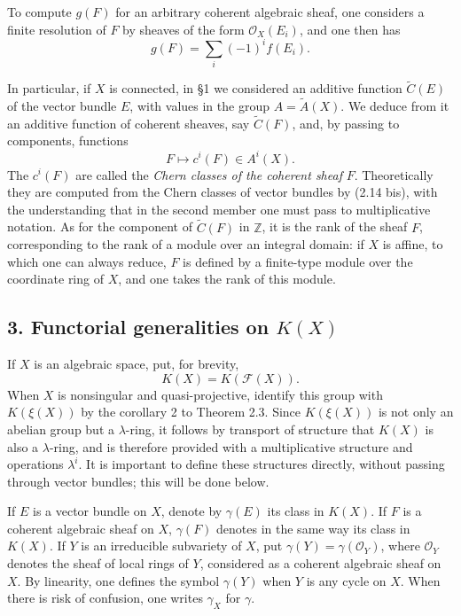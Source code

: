 \documentclass[11pt]{article}
\providecommand{\Z}{\mathbb Z}
\providecommand{\Atil}{\widetilde A}
\providecommand{\Ctil}{\widetilde C}
\providecommand{\cF}{\mathscr F}
\providecommand{\cO}{\mathcal O}
\begin{document}
To compute $g(F)$ for an arbitrary coherent algebraic sheaf, one considers a finite resolution of $F$ by sheaves of the form $\cO_X(E_i)$, and one then has
\begin{equation}\tag{2.14 bis}
 g(F)=\sum_i (-1)^i f(E_i).
\end{equation}

In particular, if $X$ is connected, in \S 1 we considered an additive function $\Ctil(E)$ of the vector bundle $E$, with values in the group $A=\Atil(X)$. We deduce from it an additive function of coherent sheaves, say $\Ctil(F)$, and, by passing to components, functions
\[
 F\longmapsto c^i(F)\in A^i(X).
\]
The $c^i(F)$ are called the \emph{Chern classes of the coherent sheaf} $F$. Theoretically they are computed from the Chern classes of vector bundles by (2.14 bis), with the understanding that in the second member one must pass to multiplicative notation. As for the component of $\Ctil(F)$ in $\Z$, it is the rank of the sheaf $F$, corresponding to the rank of a module over an integral domain: if $X$ is affine, to which one can always reduce, $F$ is defined by a finite-type module over the coordinate ring of $X$, and one takes the rank of this module.

\subsection*{3. Functorial generalities on $K(X)$}

If $X$ is an algebraic space, put, for brevity,
\[
 K(X)=K(\cF(X)).
\]
When $X$ is nonsingular and quasi-projective, identify this group with $K(\xi(X))$ by the corollary 2 to Theorem 2.3. Since $K(\xi(X))$ is not only an abelian group but a $\lambda$-ring, it follows by transport of structure that $K(X)$ is also a $\lambda$-ring, and is therefore provided with a multiplicative structure and operations $\lambda^i$. It is important to define these structures directly, without passing through vector bundles; this will be done below.

If $E$ is a vector bundle on $X$, denote by $\gamma(E)$ its class in $K(X)$. If $F$ is a coherent algebraic sheaf on $X$, $\gamma(F)$ denotes in the same way its class in $K(X)$. If $Y$ is an irreducible subvariety of $X$, put $\gamma(Y)=\gamma(\cO_Y)$, where $\cO_Y$ denotes the sheaf of local rings of $Y$, considered as a coherent algebraic sheaf on $X$. By linearity, one defines the symbol $\gamma(Y)$ when $Y$ is any cycle on $X$. When there is risk of confusion, one writes $\gamma_X$ for $\gamma$.
\end{document}
